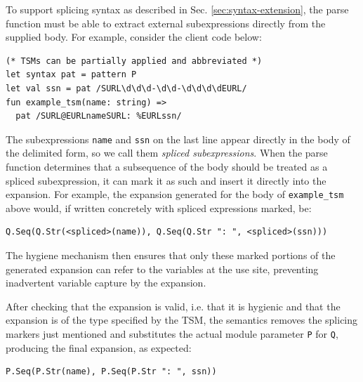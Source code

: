To support splicing syntax as described in Sec. \ref{sec:syntax-extension}, the parse function must be able to extract external subexpressions directly from the supplied body. For example, consider the client code below:
\begin{lstlisting}[numbers=none]
(* TSMs can be partially applied and abbreviated *)
let syntax pat = pattern P
let val ssn = pat /SURL\d\d\d-\d\d-\d\d\d\dEURL/
fun example_tsm(name: string) => 
  pat /SURL@EURLnameSURL: %EURLssn/
\end{lstlisting}
The subexpressions \lstinline{name} and \lstinline{ssn} on the last line appear directly in the body of the delimited form, so we call them \emph{spliced subexpressions}. When the parse function determines that a subsequence of the body should be treated as a spliced subexpression, it can mark it as such and insert it directly into the expansion. For example, the expansion generated for the body of \lstinline{example_tsm} above would, if written concretely with spliced expressions marked, be:
\begin{lstlisting}[numbers=none]
Q.Seq(Q.Str(<spliced>(name)), Q.Seq(Q.Str ": ", <spliced>(ssn)))
\end{lstlisting}
The hygiene mechanism then ensures that only these marked portions of the generated expansion can refer to the variables at the use site, preventing inadvertent variable capture by the expansion. %

After checking that the expansion is valid, i.e. that it is hygienic and that the expansion is of the type specified by the TSM, the semantics removes the splicing markers just mentioned and substitutes  the actual module parameter \lstinline{P} for \lstinline{Q}, producing the final expansion, as expected:
\begin{lstlisting}[numbers=none]
P.Seq(P.Str(name), P.Seq(P.Str ": ", ssn))\end{lstlisting}

